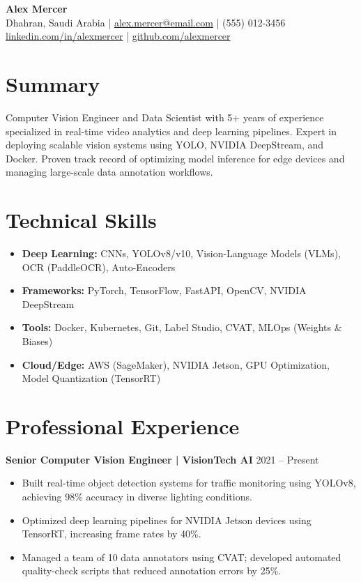\documentclass[a4paper,11pt]{article}
\begin{document}
\begin{center}
    {\huge \textbf{Alex Mercer}} \\
    Dhahran, Saudi Arabia | \href{mailto:alex.mercer@email.com}{alex.mercer@email.com} | (555) 012-3456 \\
    \href{https://linkedin.com/in/alexmercer}{linkedin.com/in/alexmercer} | \href{https://github.com/alexmercer}{github.com/alexmercer}
\end{center}

\section*{Summary}
Computer Vision Engineer and Data Scientist with 5+ years of experience specialized in real-time video analytics and deep learning pipelines. Expert in deploying scalable vision systems using YOLO, NVIDIA DeepStream, and Docker. Proven track record of optimizing model inference for edge devices and managing large-scale data annotation workflows.

\section*{Technical Skills}
\begin{itemize}[noitemsep,topsep=0pt]
    \item \textbf{Deep Learning:} CNNs, YOLOv8/v10, Vision-Language Models (VLMs), OCR (PaddleOCR), Auto-Encoders
    \item \textbf{Frameworks:} PyTorch, TensorFlow, FastAPI, OpenCV, NVIDIA DeepStream
    \item \textbf{Tools:} Docker, Kubernetes, Git, Label Studio, CVAT, MLOps (Weights \& Biases)
    \item \textbf{Cloud/Edge:} AWS (SageMaker), NVIDIA Jetson, GPU Optimization, Model Quantization (TensorRT)
\end{itemize}

\section*{Professional Experience}

\textbf{Senior Computer Vision Engineer | VisionTech AI} \hfill 2021 -- Present \\
\begin{itemize}[noitemsep,topsep=0pt]
    \item Built real-time object detection systems for traffic monitoring using YOLOv8, achieving 98\% accuracy in diverse lighting conditions.
    \item Optimized deep learning pipelines for NVIDIA Jetson devices using TensorRT, increasing frame rates by 40\%.
    \item Managed a team of 10 data annotators using CVAT; developed automated quality-check scripts that reduced annotation errors by 25\%.
\end{itemize}
\end{document}
